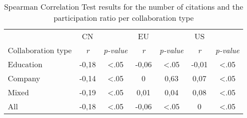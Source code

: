 \begin{table}[]
    \centering
    \begin{tabular}{lcccccc}
    \hline
                       & CN         &                  & EU         &                  & US         &                  \\ \cline{2-7} 
    Collaboration type & \textit{r} & \textit{p-value} & \textit{r} & \textit{p-value} & \textit{r} & \textit{p-value} \\ \hline
    Education          & -0,18      & \textless{}.05   & -0,06      & \textless{}.05   & -0,01      & \textless{}.05   \\
    Company            & -0,14      & \textless{}.05   & 0          & 0,63             & 0,07       & \textless{}.05   \\
    Mixed              & -0,19      & \textless{}.05   & 0,01       & 0,04             & 0,08       & \textless{}.05   \\
    All                & -0,18      & \textless{}.05   & -0,06      & \textless{}.05   & 0          & \textless{}.05   \\ \hline
    \end{tabular}
\caption{Spearman Correlation Test results for the number of citations and the participation ratio per collaboration type}
\label{table:correlation_test_citations_participation_ratio}
\end{table}